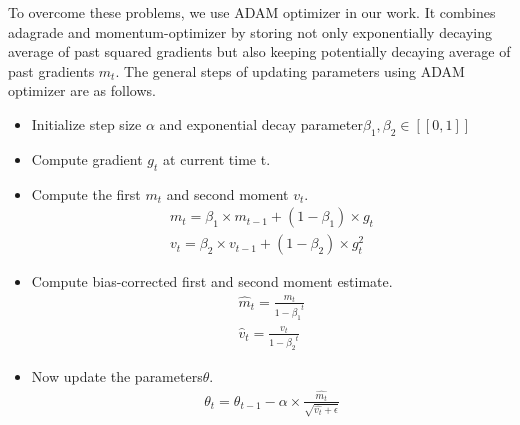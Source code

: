 \begin{itemize}
To overcome these problems, we use ADAM optimizer in our work. It combines adagrade\cite{Adagrade} and momentum-optimizer\cite{momentum} by storing not only exponentially decaying average of past squared gradients but also keeping potentially decaying average of past gradients $m_t$. The general steps of updating parameters using ADAM optimizer are as follows.
\begin{itemize}
    \item Initialize step size $\alpha$ and exponential decay parameter$\beta_1, \beta_2  \in [\![ 0,1]\!]$
    \item Compute gradient $g_t$ at current time t.
    \item Compute the first $m_t$ and second moment $v_t$.
    \begin{equation*}\label{eq:moment}
        \begin{aligned}
            m_t = \beta_1 \times m_{t-1} + \left ( 1 - \beta_1 \right ) \times g_t \\
            v_t= \beta_2 \times v_{t-1} + \left ( 1 - \beta_2 \right ) \times g_t^{2}
        \end{aligned}
    \end{equation*}
    \item Compute bias-corrected first  and second moment estimate.
     \begin{equation*}\label{eq:moment2}
        \begin{aligned}
            \widehat{m}_t = \frac{m_t}{1-{\beta_1}^{t}} \\
            \widehat{v}_t = \frac{v_t}{1-{\beta_2}^{t}}
        \end{aligned}
    \end{equation*}
    \item Now update the parameters$\theta$.
    \begin{equation*}\label{eq:moment3}
        \begin{aligned}
            \theta_t =\theta_{t-1} - \alpha \times \frac{\widehat{m_{t}}}{\sqrt{\widehat{v_t} + \epsilon }}
        \end{aligned}
    \end{equation*}
\end{itemize}

\end{itemize}
 
